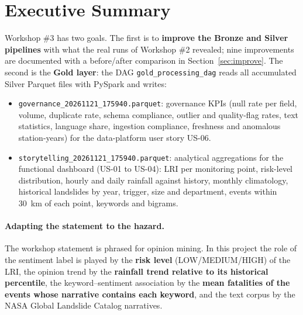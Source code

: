 \documentclass[11pt,a4paper]{article}
\begin{document}
\section{Executive Summary}
Workshop \#3 has two goals. The first is to \textbf{improve the Bronze and Silver pipelines} with what the real runs of
Workshop \#2 revealed; nine improvements are documented with a before/after comparison in Section~\ref{sec:improve}.
The second is the \textbf{Gold layer}: the DAG \texttt{gold\_\allowbreak{}processing\_\allowbreak{}dag} reads all accumulated Silver Parquet files with
PySpark and writes:
\begin{itemize}
\item \texttt{governance\_\allowbreak{}20261121\_\allowbreak{}175940.\allowbreak{}parquet}: governance KPIs (null rate per field, volume, duplicate rate, schema compliance, outlier and
quality-flag rates, text statistics, language share, ingestion compliance, freshness and anomalous station-years) for the
data-platform user story US-06.
\item \texttt{storytelling\_\allowbreak{}20261121\_\allowbreak{}175940.\allowbreak{}parquet}: analytical aggregations for the functional dashboard (US-01 to US-04): LRI per monitoring
point, risk-level distribution, hourly and daily rainfall against history, monthly climatology, historical landslides by
year, trigger, size and department, events within 30~km of each point, keywords and bigrams.
\end{itemize}
\paragraph{Adapting the statement to the hazard.} The workshop statement is phrased for opinion mining. In this project
the role of the sentiment label is played by the \textbf{risk level} (LOW/MEDIUM/HIGH) of the LRI, the opinion trend
by the \textbf{rainfall trend relative to its historical percentile}, the keyword--sentiment association by the
\textbf{mean fatalities of the events whose narrative contains each keyword}, and the text corpus by the NASA Global
Landslide Catalog narratives.
\end{document}
